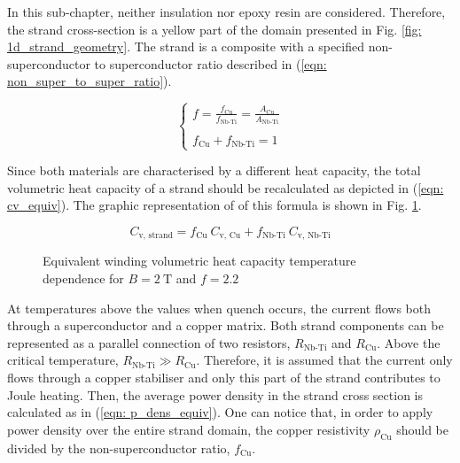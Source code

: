 
In this sub-chapter, neither insulation nor epoxy resin are considered. Therefore, the strand cross-section is a yellow part of the domain presented in Fig. \ref{fig: 1d_strand_geometry}. The strand is a composite with a specified non-superconductor to superconductor ratio described in (\ref{eqn: non_super_to_super_ratio}).

\begin{equation}
    \left\{ \begin{array}{ll}
    f = \frac{f_\text{Cu}}{f_\text{Nb-Ti}} = \frac{A_\text{Cu}}{A_\text{Nb-Ti}}\\ \\
    f_\text{Cu} + f_\text{Nb-Ti} = 1
    \end{array} \right.
    \label{eqn: non_super_to_super_ratio}
\end{equation}

Since both materials are characterised by a different heat capacity, the total volumetric heat capacity of a strand should be recalculated as depicted in (\ref{eqn: cv_equiv}). The graphic representation of of this formula is shown in Fig. \ref{fig:eq_wind_cp}.

\begin{equation}
    C_\text{v, strand} = f_\text{Cu} ~ C_\text{v, Cu} + f_\text{Nb-Ti} ~ C_\text{v, Nb-Ti}
    \label{eqn: cv_equiv}
\end{equation}

\begin{figure}[h!]
\centering
    \caption{Equivalent winding volumetric heat capacity temperature dependence for $B=2~\text{T}$ and $f=2.2$}
    \label{fig:eq_wind_cp}
\end{figure}

At temperatures above the values when quench occurs, the current flows both through a superconductor and a copper matrix. Both strand components can be represented as a parallel connection of two resistors, $R_\text{Nb-Ti}$ and $R_\text{Cu}$. Above the critical temperature, $R_\text{Nb-Ti} \gg R_\text{Cu}$. Therefore, it is assumed that the current only flows through a copper stabiliser and only this part of the strand contributes to Joule heating. Then, the average power density in the strand cross section is calculated as in (\ref{eqn: p_dens_equiv}). One can notice that, in order to apply power density over the entire strand domain, the copper resistivity $\rho_\text{Cu}$ should be divided by the non-superconductor ratio, $f_\text{Cu}$.

